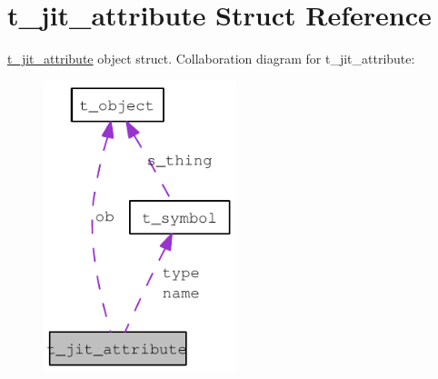 \hypertarget{structt__jit__attribute}{
\section{t\_\-jit\_\-attribute Struct Reference}
\label{structt__jit__attribute}
}


\hyperlink{structt__jit__attribute}{t\_\-jit\_\-attribute} object struct.  
Collaboration diagram for t\_\-jit\_\-attribute:\nopagebreak
\begin{figure}[H]
\begin{center}
\leavevmode
\includegraphics[width=159pt]{structt__jit__attribute__coll__graph}
\end{center}
\end{figure}
